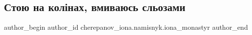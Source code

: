  
 
 
 
 

\subsection{Стою на колінах, вмиваюсь сльозами}
\label{sec:26_09_2022.fb.cherepanov_iona.namisnyk.iona_monastyr.1.stoyu_na_kol_nakh__v}

\ifcmt
 author_begin
   author_id cherepanov_iona.namisnyk.iona_monastyr
 author_end
\fi
